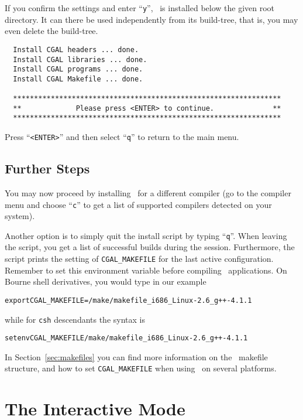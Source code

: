 If you confirm the settings and enter ``\texttt{y}'', \cgal\ is
installed below the given root directory. It can there be used
independently from its build-tree, that is, you may even delete the
build-tree.

{\ccTexHtml{\scriptsize}{}
\begin{verbatim}
  Install CGAL headers ... done.
  Install CGAL libraries ... done.
  Install CGAL programs ... done.
  Install CGAL Makefile ... done.

  ****************************************************************
  **             Please press <ENTER> to continue.              **
  ****************************************************************
\end{verbatim}
}

Press ``\texttt{<ENTER>}'' and then select ``\texttt{q}'' to return to
the main menu.

\subsection{Further Steps\label{sec:further}}

You may now proceed by installing \cgal\ for a different compiler (go
to the compiler menu and choose ``\texttt{c}'' to get a list of
supported compilers detected on your system).

Another option is to simply quit the install script by typing
``\texttt{q}''. When leaving the script, you get a list of successful
builds during the session.  Furthermore, the script prints the setting
of \texttt{CGAL\_MAKEFILE} for the last active configuration. Remember
to set this environment variable before compiling \cgal\ applications.
On Bourne shell derivatives, you would type in our example
\begin{alltt}
      export CGAL_MAKEFILE=\cgaldir/make/makefile_i686_Linux-2.6_g++-4.1.1
\end{alltt}
while for \texttt{csh} descendants the syntax is
\begin{alltt}
      setenv CGAL_MAKEFILE \cgaldir/make/makefile_i686_Linux-2.6_g++-4.1.1
\end{alltt}
In Section~\ref{sec:makefiles} you can find more information on the
\cgal\ makefile structure, and how to set \texttt{CGAL\_MAKEFILE} when
using \cgal\ on several platforms.

\section{The Interactive Mode\label{sec:interactive-mode}}


